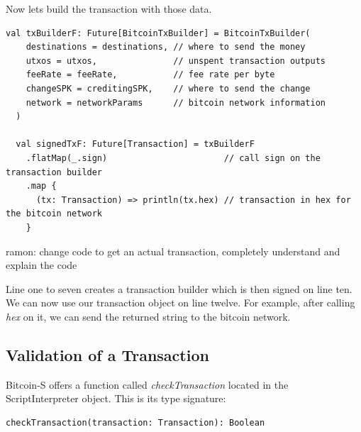 \documentclass[runningheads]{llncs}
\newcommand{\todo}[1]{{\par \color{red}#1}}
\begin{document}
Now lets build the transaction with those data.
\begin{lstlisting}[style=scala]
  val txBuilderF: Future[BitcoinTxBuilder] = BitcoinTxBuilder(
    destinations = destinations, // where to send the money
    utxos = utxos,               // unspent transaction outputs
    feeRate = feeRate,           // fee rate per byte
    changeSPK = creditingSPK,    // where to send the change
    network = networkParams      // bitcoin network information
  )

  val signedTxF: Future[Transaction] = txBuilderF
    .flatMap(_.sign)                       // call sign on the transaction builder
    .map {
      (tx: Transaction) => println(tx.hex) // transaction in hex for the bitcoin network
    }
\end{lstlisting}

\todo{ramon: change code to get an actual transaction, completely understand and explain the code}

Line one to seven creates a transaction builder which is then signed
on line ten.  We can now use our transaction object on line twelve.
For example, after calling \emph{hex} on it, we can send the returned
string to the bitcoin network.


\subsection{Validation of a Transaction}

Bitcoin-S offers a function called \emph{checkTransaction} located in the ScriptInterpreter object.
This is its type signature:
\begin{lstlisting}[style=scala]
  checkTransaction(transaction: Transaction): Boolean
\end{lstlisting}
\end{document}
